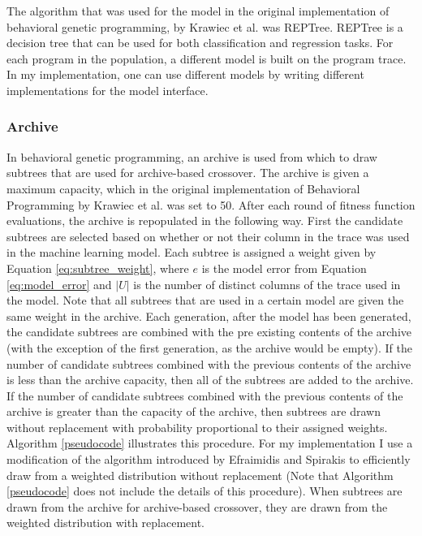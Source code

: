 The algorithm that was used for the model in the original implementation of behavioral genetic programming, by Krawiec et al. was REPTree. \cite{reptree}  REPTree is a decision tree that can be used for both classification and regression tasks.  For each program in the population, a different model is built on the program trace.  In my implementation, one can use different models by writing different implementations for the model interface.

\subsubsection{Archive}
In behavioral genetic programming, an archive is used from which to draw subtrees that are used for archive-based crossover.  The archive is given a maximum capacity, which in the original implementation of Behavioral Programming by Krawiec et al. was set to 50.  After each round of fitness function evaluations, the archive is repopulated in the following way.  First the candidate subtrees are selected based on whether or not their column in the trace was used in the machine learning model.  Each subtree is assigned a weight given by Equation \ref{eq:subtree_weight}, where $e$ is the model error from Equation \ref{eq:model_error} and $|U|$ is the number of distinct columns of the trace used in the model.  Note that all subtrees that are used in a certain model are given the same weight in the archive.  Each generation, after the model has been generated, the candidate subtrees are combined with the pre existing contents of the archive (with the exception of the first generation, as the archive would be empty).  If the number of candidate subtrees combined with the previous contents of the archive is less than the archive capacity, then all of the subtrees are added to the archive.  If the number of candidate subtrees combined with the previous contents of the archive is greater than the capacity of the archive, then subtrees are drawn without replacement with probability proportional to their assigned weights.  Algorithm \ref{pseudocode} illustrates this procedure.  For my implementation I use a modification \cite{samplingnew} of the algorithm introduced by Efraimidis and Spirakis \cite{samplingold} to efficiently draw from a weighted distribution without replacement (Note that Algorithm \ref{pseudocode} does not include the details of this procedure).  When subtrees are drawn from the archive for archive-based crossover, they are drawn from the weighted distribution with replacement.

